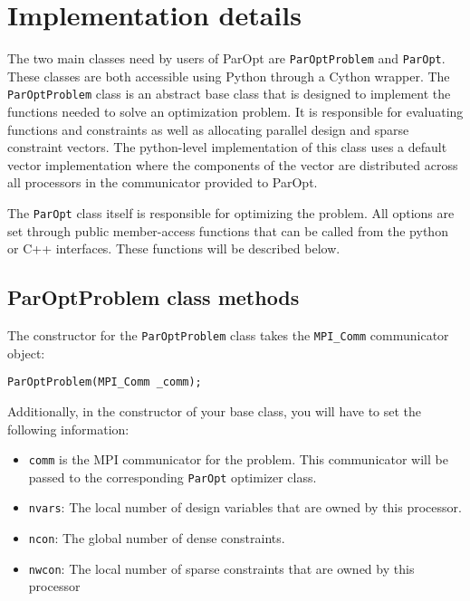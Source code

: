 \documentclass[12pt]{article}
\begin{document}
\section{Implementation details}

The two main classes need by users of ParOpt are \texttt{ParOptProblem} and \texttt{ParOpt}.
These classes are both accessible using Python through a Cython wrapper.
The \texttt{ParOptProblem} class is an abstract base class that is designed to implement the functions needed to solve an optimization problem.
It is responsible for evaluating functions and constraints as well as allocating parallel design and sparse constraint vectors.
The python-level implementation of this class uses a default vector implementation where the components of the vector are distributed across all processors in the communicator provided to ParOpt.

The \texttt{ParOpt} class itself is responsible for optimizing the problem.
All options are set through public member-access functions that can be called from the python or C++ interfaces.
These functions will be described below.

\subsection{ParOptProblem class methods}

The constructor for the \texttt{ParOptProblem} class takes the \texttt{MPI\_Comm} communicator object:
%
\begin{verbatim}
ParOptProblem(MPI_Comm _comm);
\end{verbatim}

Additionally, in the constructor of your base class, you will have to set the following information:
\begin{itemize}
\item \texttt{comm} is the MPI communicator for the problem.
This communicator will be passed to the corresponding \texttt{ParOpt} optimizer class.

\item \texttt{nvars}: The local number of design variables that are owned by this processor.

\item \texttt{ncon}: The global number of dense constraints.

\item \texttt{nwcon}: The local number of sparse constraints that are owned by this processor
\end{itemize}
\end{document}
